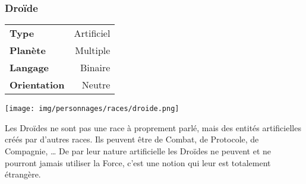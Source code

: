 \subsubsection{Droïde}
\begin{samepage}
	\vspace{4\baselineskip}
	\begin{tabular}{|l|r|}
		\textbf{Type} 			& Artificiel \\
	   	\textbf{Planète} 		& Multiple \\
	   	\textbf{Langage} 		& Binaire \\
	   	\textbf{Orientation} 	& Neutre \\
	\end{tabular}

	\vspace{-11\baselineskip}

	\begin{flushright}
		\texttt{[image: img/personnages/races/droide.png]}
	\end{flushright}
	\vspace{-2\baselineskip}
\end{samepage}

Les Droïdes ne sont pas une race à proprement parlé, mais des entités artificielles créés par d’autres races. Ils peuvent être de Combat, de Protocole, de Compagnie, \ldots 
De par leur nature artificielle les Droïdes ne peuvent et ne pourront jamais utiliser la Force, c’est une notion qui leur est totalement étrangère.

